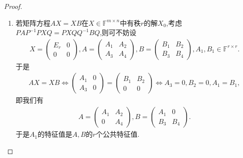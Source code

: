 \documentclass[../../main.tex]{subfiles}%
\begin{document}
\begin{proof}
\begin{enumerate}[(1)]
\item 若矩阵方程$AX = XB$在$X \in \mathbb{F}^{m \times n}$中有秩$r$的解$X_0$,考虑$PAP^{-1}PXQ=PXQQ^{-1}BQ$,则可不妨设
\begin{align*}
X = \begin{pmatrix} E_r & 0 \\ 0 & 0 \end{pmatrix}, A = \begin{pmatrix} A_1 & A_2 \\ A_3 & A_4 \end{pmatrix}, B = \begin{pmatrix} B_1 & B_2 \\ B_3 & B_4 \end{pmatrix}, A_1, B_1 \in \mathbb{F}^{r \times r}.
\end{align*}
于是
\begin{align*}
AX = XB \iff \begin{pmatrix} A_1 & 0 \\ A_3 & 0 \end{pmatrix} = \begin{pmatrix} B_1 & B_2 \\ 0 & 0 \end{pmatrix} \iff A_3 = 0, B_2 = 0, A_1 = B_1,
\end{align*}
即我们有
\begin{align*}
A = \begin{pmatrix} A_1 & A_2 \\ 0 & A_4 \end{pmatrix}, B = \begin{pmatrix} A_1 & 0 \\ B_3 & B_4 \end{pmatrix}.
\end{align*}
于是$A_1$的特征值是$A,B$的$r$个公共特征值.
\end{enumerate}

\end{proof}
\end{document}
